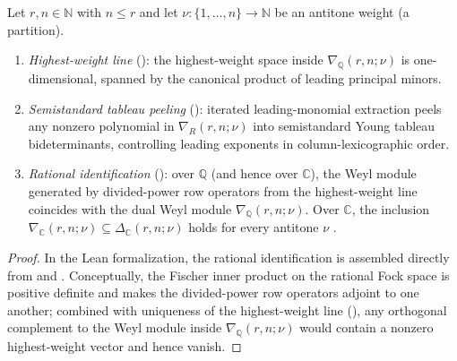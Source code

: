 \begin{theorem}
\label{thm:ch02-weyl-structure}
Let $r, n \in \mathbb{N}$ with $n \le r$ and let $\nu : \{1, \dots, n\} \to \mathbb{N}$
be an antitone weight (a partition).
\begin{enumerate}
  \item \emph{Highest-weight line} ():
        the highest-weight space inside $\nabla_{\mathbb{Q}}(r, n; \nu)$ is
        one-dimensional, spanned by the canonical product of leading principal
        minors.
  \item \emph{Semistandard tableau peeling} ():
        iterated leading-monomial extraction peels any nonzero polynomial in
        $\nabla_R(r, n; \nu)$ into semistandard Young tableau bideterminants,
        controlling leading exponents in column-lexicographic order.
  \item \emph{Rational identification} ():
        over $\mathbb{Q}$ (and hence over $\mathbb{C}$), the Weyl module
        generated by divided-power row operators from the highest-weight line
        coincides with the dual Weyl module $\nabla_{\mathbb{Q}}(r, n; \nu)$.
        Over $\mathbb{C}$, the inclusion
        $\nabla_{\mathbb{C}}(r, n; \nu) \subseteq \Delta_{\mathbb{C}}(r, n; \nu)$
        holds for every antitone $\nu$
        .
\end{enumerate}
\end{theorem}

\begin{proof}
In the Lean formalization, the rational identification
 is assembled directly
from  and
.
Conceptually, the Fischer inner product on the rational Fock space is positive
definite and makes the divided-power row operators adjoint to one another;
combined with uniqueness of the highest-weight line
(), any
orthogonal complement to the Weyl module inside $\nabla_{\mathbb{Q}}(r, n; \nu)$
would contain a nonzero highest-weight vector and hence vanish.
\end{proof}

